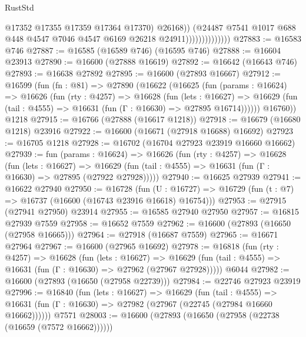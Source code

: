 \begin{lexlean}{RustStd}
\begin{coremodule}
                                    @17352
                                    @17355
                                    @17359
                                    @17364
                                    @17370)
                                  @26168))
                              (@24487
                                @7541
                                @1017
                                @688
                                @448
                                @4547
                                @7046
                                @4547
                                @6169
                                @26218
                                @24911))))))))))))))
@27883 := @16583 @746
@27887 := @16585 (@16589 @746) (@16595 @746)
@27888 := @16604 @23913
@27890 := @16600 (@27888 @16619)
@27892 := @16642 (@16643 @746)
@27893 := @16638 @27892
@27895 := @16600 (@27893 @16667)
@27912 := @16599
    (fun (fn : @81) =>
    @27890
      (@16622
        (@16625
          (fun (params : @16624) =>
          @16626
            (fun (rty : @4257) =>
            @16628
              (fun (lets : @16627) =>
              @16629 (fun (tail : @4555) => @16631 (fun (Γ : @16630) => @27895 @16714))))))
        @16760))
    @1218
@27915 := @16766 (@27888 (@16617 @1218))
@27918 := @16679 (@16680 @1218) @23916
@27922 := @16600 (@16671 (@27918 @16688) @16692)
@27923 := @16705 @1218
@27928 := @16702 (@16704 @27923 @23919 @16660 @16662)
@27939 := fun (params : @16624) =>
  @16626
    (fun (rty : @4257) =>
    @16628
      (fun (lets : @16627) =>
      @16629 (fun (tail : @4555) => @16631 (fun (Γ : @16630) => @27895 (@27922 @27928)))))
@27940 := @16625 @27939
@27941 := @16622 @27940
@27950 := @16728
    (fun (U : @16727) => @16729 (fun (t : @7) => @16737 (@16600 (@16743 @23916 @16618) @16754)))
@27953 := @27915 (@27941 @27950) @23914
@27955 := @16585 @27940 @27950
@27957 := @16815 @27939 @7559
@27958 := @16652 @7559
@27962 := @16600 (@27893 (@16650 (@27958 @16665)))
@27964 := @27918 (@16687 @7559)
@27965 := @16671 @27964
@27967 := @16600 (@27965 @16692)
@27978 := @16818
    (fun (rty : @4257) =>
    @16628
      (fun (lets : @16627) =>
      @16629 (fun (tail : @4555) => @16631 (fun (Γ : @16630) => @27962 (@27967 @27928)))))
    @6044
@27982 := @16600 (@27893 (@16650 (@27958 @22739)))
@27984 := @22746 @27923 @23919
@27996 := @16840
    (fun (lets : @16627) =>
    @16629
      (fun (tail : @4555) =>
      @16631 (fun (Γ : @16630) => @27982 (@27967 (@22745 (@27984 @16660 @16662))))))
    @7571
@28003 := @16600 (@27893 (@16650 (@27958 (@22738 (@16659 (@7572 @16662))))))

\end{coremodule}
\end{lexlean}
